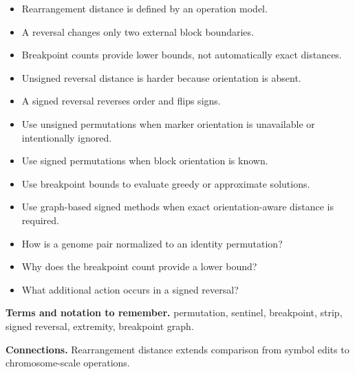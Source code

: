 \documentclass[11pt]{article}
\begin{document}
\begin{tcolorbox}[enhanced,breakable,title={Key takeaways},
  colback=white,colframe=Primary,fonttitle=\small\sffamily\bfseries,fontupper=\footnotesize,
  boxsep=0.6mm,left=1.5mm,right=1.5mm,top=1mm,bottom=1mm,before skip=3pt,after skip=3pt]
\begin{itemize}
  \item Rearrangement distance is defined by an operation model.
  \item A reversal changes only two external block boundaries.
  \item Breakpoint counts provide lower bounds, not automatically exact distances.
  \item Unsigned reversal distance is harder because orientation is absent.
  \item A signed reversal reverses order and flips signs.
\end{itemize}
\end{tcolorbox}

\begin{tcolorbox}[enhanced,breakable,title={Algorithm selection / when to use this},
  colback=Primary!3,colframe=Primary,fonttitle=\small\sffamily\bfseries,fontupper=\footnotesize,
  boxsep=0.6mm,left=1.5mm,right=1.5mm,top=1mm,bottom=1mm,before skip=3pt,after skip=3pt]
\begin{itemize}
  \item Use unsigned permutations when marker orientation is unavailable or intentionally ignored.
  \item Use signed permutations when block orientation is known.
  \item Use breakpoint bounds to evaluate greedy or approximate solutions.
  \item Use graph-based signed methods when exact orientation-aware distance is required.
\end{itemize}
\end{tcolorbox}

\begin{tcolorbox}[enhanced,breakable,title={Self-test questions},
  colback=white,colframe=Accent,fonttitle=\small\sffamily\bfseries,fontupper=\footnotesize,
  boxsep=0.6mm,left=1.5mm,right=1.5mm,top=1mm,bottom=1mm,before skip=3pt,after skip=3pt]
\begin{itemize}
  \item How is a genome pair normalized to an identity permutation?
  \item Why does the breakpoint count provide a lower bound?
  \item What additional action occurs in a signed reversal?
\end{itemize}
\end{tcolorbox}

{\footnotesize
\textbf{Terms and notation to remember.} permutation, sentinel, breakpoint, strip, signed reversal, extremity, breakpoint graph.

\textbf{Connections.} Rearrangement distance extends comparison from symbol edits to chromosome-scale operations.
}
\end{document}
